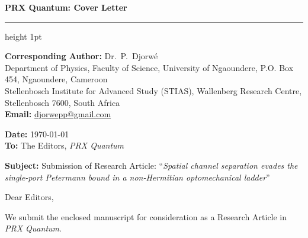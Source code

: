 \documentclass[11pt,a4paper]{article}
\begin{document}
\thispagestyle{empty}

{\noindent\Large\bfseries\color{apsblue} PRX Quantum: Cover Letter}
\vspace{2mm}
\hrule height 1pt
\vspace{4mm}

\begin{small}
\begin{raggedright}
\textbf{Corresponding Author:} Dr.~P.~Djorw\'e\\
Department of Physics, Faculty of Science, University of Ngaoundere, P.O. Box 454, Ngaoundere, Cameroon\\
Stellenbosch Institute for Advanced Study (STIAS), Wallenberg Research Centre, Stellenbosch 7600, South Africa\\
\textbf{Email:} \href{mailto:djorwepp@gmail.com}{djorwepp@gmail.com}
\end{raggedright}
\end{small}

\vspace{3mm}
\textbf{Date:} \today\\[1mm]
\textbf{To:} The Editors, \textit{PRX Quantum}

\vspace{3mm}
\noindent\textbf{Subject:} Submission of Research Article: ``\textit{Spatial channel separation evades the single-port Petermann bound in a non-Hermitian optomechanical ladder}''

\vspace{3mm}
Dear Editors,

We submit the enclosed manuscript for consideration as a Research Article in \textit{PRX Quantum}.
\end{document}
